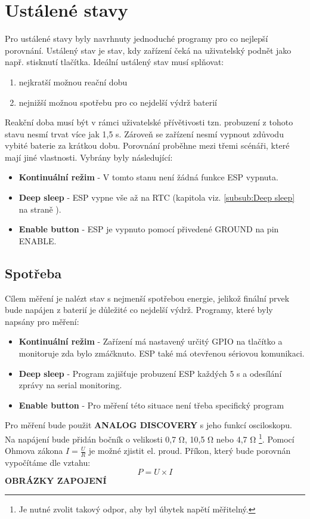 \documentclass[a4paper, 12pt]{report}
\begin{document}
			\section{Ustálené stavy}
				Pro ustálené stavy byly navrhnuty jednoduché programy pro co nejlepší porovnání. Ustálený stav je stav, kdy zařízení čeká na uživatelský podnět jako např. stisknutí tlačítka. Ideální ustálený stav musí splňovat:
				\begin{enumerate}
					\item nejkratší možnou reační dobu
					\item nejnižší možnou spotřebu pro co nejdelší výdrž baterií
				\end{enumerate}
				Reakční doba musí být v rámci uživatelské přívětivosti tzn. probuzení z tohoto stavu nesmí trvat více jak 1,5 \si{s}. Zároveň se zařízení nesmí vypnout zdůvodu vybité baterie za krátkou dobu. Porovnání proběhne mezi třemi scénáři, které mají jiné vlastnosti. Vybrány byly následující:
				\begin{itemize}
					\item {\bf Kontinuální režim} - V tomto stanu není žádná funkce ESP vypnuta.
					\item {\bf Deep sleep} - ESP vypne vše až na RTC (kapitola viz. \ref{subsub:Deep sleep} na straně \pageref{subsub:Deep sleep}).
					\item {\bf Enable button} - ESP je vypnuto pomocí přivedené GROUND na pin ENABLE.
				\end{itemize}


				\subsection{Spotřeba} \label{metodika:Ustálené stavy spotřeba}
					Cílem měření je nalézt stav s nejmenší spotřebou energie, jelikož finální prvek bude napájen z baterií je důležité co nejdelší výdrž. Programy, které byly napsány pro měření:\\
					\begin{itemize}
						\item {\bf Kontinuální režim} - Zařízení má nastavený určitý GPIO na tlačítko a monitoruje zda bylo zmáčknuto. ESP také má otevřenou sériovou komunikaci.
						\item {\bf Deep sleep} - Program zajišťuje probuzení ESP každých 5 \si{s} a odesílání zprávy na serial monitoring.
						\item {\bf Enable button} - Pro měření této situace není třeba specifický program
					\end{itemize}
					Pro měření bude použit {\bf ANALOG DISCOVERY} s jeho funkcí osciloskopu. Na napájení bude přidán bočník o velikosti 0,7 \si{\ohm}, 10,5 \si{\ohm} nebo 4,7 \si{\ohm} \footnote{Je nutné zvolit takový odpor, aby byl úbytek napětí měřitelný.}. Pomocí Ohmova zákona $ I = \frac{U}{R} $ je možné zjistit el. proud.
					Příkon, který bude porovnán vypočítáme dle vztahu:
					$$P = U \times I$$
					{\bf OBRÁZKY ZAPOJENÍ}
\end{document}
